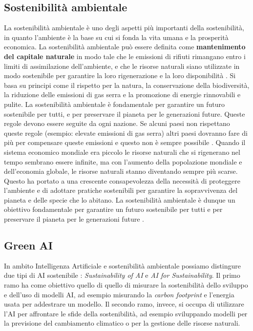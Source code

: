 \subsection{Sostenibilità ambientale}
La sostenibilità ambientale è uno degli aspetti più importanti della sostenibilità, in quanto l'ambiente è la base su cui si fonda la vita umana e la prosperità economica.
La sostenibilità ambientale può essere definita come \textbf{mantenimento del capitale naturale} in modo tale che le emissioni di rifiuti rimangano entro i limiti di assimilazione dell'ambiente, e che le risorse naturali siano utilizzate in modo sostenibile per garantire la loro rigenerazione e la loro disponibilità \cite{SostenibAmbient}. Si basa su principi come il rispetto per la natura, la conservazione della biodiversità, la riduzione delle emissioni di gas serra e la promozione di energie rinnovabili e pulite. La sostenibilità ambientale è fondamentale per garantire un futuro sostenibile per tutti, e per preservare il pianeta per le generazioni future. Queste regole devono essere seguite da ogni nazione. Se alcuni paesi non rispettano queste regole (esempio: elevate emissioni di gas serra) altri paesi dovranno fare di più per compensare queste emissioni e questo non è sempre possibile \cite{SostenibAmbient}.
Quando il sistema economico mondiale era piccolo le risorse naturali che si rigenerano nel tempo sembrano essere infinite, ma con l'aumento della popolazione mondiale e dell'economia globale, le risorse naturali stanno diventando sempre più scarse. Questo ha portato a una crescente consapevolezza della necessità di proteggere l'ambiente e di adottare pratiche sostenibili per garantire la sopravvivenza del pianeta e delle specie che lo abitano. La sostenibilità ambientale è dunque un obiettivo fondamentale per garantire un futuro sostenibile per tutti e per preservare il pianeta per le generazioni future \cite{SostenibAmbient}.


\subsection{Green AI}

In ambito Intelligenza Artificiale e sostenibilità ambientale possiamo distingure due tipi di AI sostenibile \cite{sostenibilitaAI}: \textit{Sustainability of AI} e \textit{AI for Sustainability}. Il primo ramo ha come obiettivo quello di quello di misurare la sostenibilità dello sviluppo e dell'uso di modelli AI, ad esempio misurando la \textit{carbon footprint} e l'energia usata per addestrare un modello. Il secondo ramo, invece, si occupa di utilizzare l'AI per affrontare le sfide della sostenibilità, ad esempio sviluppando modelli per la previsione del cambiamento climatico o per la gestione delle risorse naturali.

